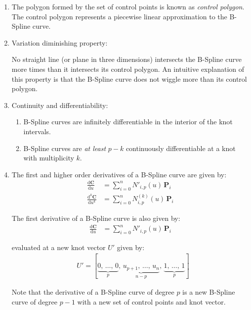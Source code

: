 \begin{enumerate}
    \item The polygon formed by the set of control points is known as \textit{control polygon}. The control polygon represents a piecewise linear approximation to the B-Spline curve.

    \item Variation diminishing property:
    
    No straight line (or plane in three dimensions) intersects the B-Spline curve more times than it intersects its control polygon. An intuitive explanation of this property is that the B-Spline curve does not wiggle more than its control polygon.
    
    \item Continuity and differentiability:
    \begin{enumerate}
        \item B-Spline curves are infinitely differentiable in the interior of the knot intervals.
        \item B-Spline curves are \textit{at least} $p-k$ continuously differentiable at a knot with multiplicity $k$.
    \end{enumerate}
    
    \item The first and higher order derivatives of a B-Spline curve are given by:
        \begin{align*}
            \frac{\mathrm{d}\mathbf{C}}{\mathrm{d}u} &= \sum_{i=0}^{n}N'_{i,p}(u)\, \mathbf{P}_{i} \\
            \frac{\mathrm{d}^{k}\mathbf{C}}{\mathrm{d}u^{k}} &= \sum_{i=0}^{n}N^{(k)}_{i,p}(u)\, \mathbf{P}_{i}
        \end{align*}
        
        The first derivative of a B-Spline curve is also given by:
        \begin{align*}
            \frac{\mathrm{d}\mathbf{C}}{\mathrm{d}u} &= \sum_{i=0}^{n}N'_{i,p}(u)\, \mathbf{P}_{i}
        \end{align*}
        
        evaluated at a new knot vector $U'$ given by:
        \begin{align*}
            & U' = [\underbrace{0,\, \dots,\, 0}_{p},\, \underbrace{u_{p+1},\, \dots,\, u_{n}}_{n-p},\, \underbrace{1,\, \dots,\, 1}_{p}]
        \end{align*}
        
        Note that the derivative of a B-Spline curve of degree $p$ is a new B-Spline curve of degree $p-1$ with a new set of control points and knot vector.
        

\end{enumerate}
